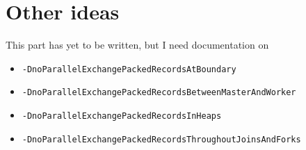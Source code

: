 \section{Other ideas}

This part has yet to be written, but I need documentation on 

\begin{itemize}
  \item \texttt{-DnoParallelExchangePackedRecordsAtBoundary}
  \item \texttt{-DnoParallelExchangePackedRecordsBetweenMasterAndWorker}
  \item \texttt{-DnoParallelExchangePackedRecordsInHeaps}
  \item \texttt{-DnoParallelExchangePackedRecordsThroughoutJoinsAndForks}
\end{itemize}

%

